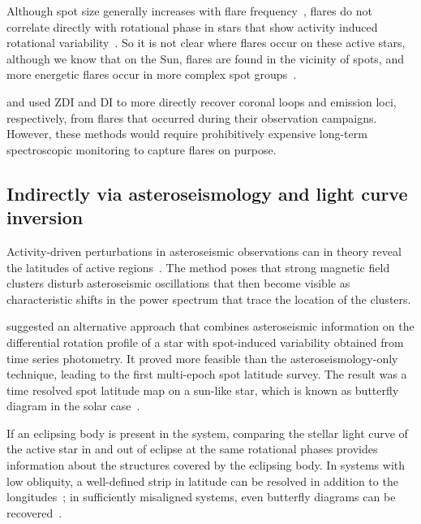 \documentclass[proof]{WileyASNA-v1}
\begin{document}
Although spot size generally increases with flare frequency~\citep{maehara2017}, flares do not correlate directly with rotational phase in stars that show activity induced rotational variability~\citep[i.e., dark spots or bright regions,][]{ramsay2013,doyle2019}. So it is not clear where flares occur on these active stars, although we know that on the Sun, flares are found in the vicinity of spots, and more energetic flares occur in more complex spot groups~\citep{sammis2000}. %

\citet{berdyugina2017} and \citet{wolter2008} used ZDI and DI to more directly recover coronal loops and emission loci, respectively, from flares that occurred during their observation campaigns. However, these methods would require prohibitively expensive long-term spectroscopic monitoring to capture flares on purpose.

\subsection{Indirectly via asteroseismology and light curve inversion}

Activity-driven perturbations in asteroseismic observations can in theory reveal the latitudes of active regions~\citep{gizon2002, papini2015, papini2019}. The method poses that strong magnetic field clusters disturb asteroseismic oscillations that then become visible as characteristic shifts in the power spectrum that trace the location of the clusters.

\citet{berdyugina2005} suggested an alternative approach that combines asteroseismic information on the differential rotation profile of a star with spot-induced variability obtained from time series photometry. It proved more feasible than the asteroseismology-only technique, leading to the first multi-epoch spot latitude survey. The result was a time resolved spot latitude map on a sun-like star, which is known as butterfly diagram in the solar case~\citep{bazot2018}.%

If an eclipsing body is present in the system, comparing the stellar light curve of the active star in and out of eclipse at the same rotational phases provides information about the structures covered by the eclipsing body. In systems with low obliquity, a well-defined strip in latitude can be resolved in addition to the longitudes~\citep{huber2009,huber2010}; in sufficiently misaligned systems, even butterfly diagrams can be recovered~\citep{netto2020}. 
\end{document}
